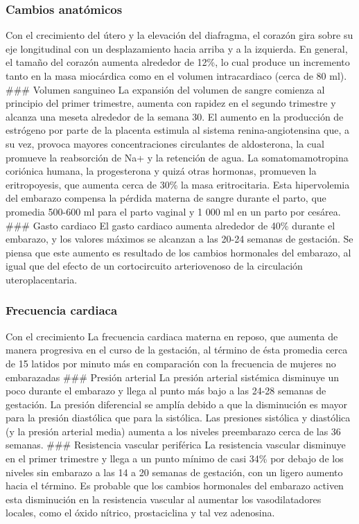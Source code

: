 \documentclass[
]{article}
\begin{document}
\hypertarget{cambios-anatuxf3micos}{%
\subsubsection{Cambios anatómicos}\label{cambios-anatuxf3micos}}

Con el crecimiento del útero y la elevación del diafragma, el corazón
gira sobre su eje longitudinal con un desplazamiento hacia arriba y a la
izquierda. En general, el tamaño del corazón aumenta alrededor de 12\%,
lo cual produce un incremento tanto en la masa miocárdica como en el
volumen intracardiaco (cerca de 80 ml). \#\#\# Volumen sanguineo La
expansión del volumen de sangre comienza al principio del primer
trimestre, aumenta con rapidez en el segundo trimestre y alcanza una
meseta alrededor de la semana 30. El aumento en la producción de
estrógeno por parte de la placenta estimula al sistema
renina-angiotensina que, a su vez, provoca mayores concentraciones
circulantes de aldosterona, la cual promueve la reabsorción de Na+ y la
retención de agua. La somatomamotropina coriónica humana, la
progesterona y quizá otras hormonas, promueven la eritropoyesis, que
aumenta cerca de 30\% la masa eritrocitaria. Esta hipervolemia del
embarazo compensa la pérdida materna de sangre durante el parto, que
promedia 500-600 ml para el parto vaginal y 1 000 ml en un parto por
cesárea. \#\#\# Gasto cardiaco El gasto cardiaco aumenta alrededor de
40\% durante el embarazo, y los valores máximos se alcanzan a las 20-24
semanas de gestación. Se piensa que este aumento es resultado de los
cambios hormonales del embarazo, al igual que del efecto de un
cortocircuito arteriovenoso de la circulación uteroplacentaria.

\hypertarget{frecuencia-cardiaca}{%
\subsubsection{Frecuencia cardiaca}\label{frecuencia-cardiaca}}

Con el crecimiento La frecuencia cardiaca materna en reposo, que aumenta
de manera progresiva en el curso de la gestación, al término de ésta
promedia cerca de 15 latidos por minuto más en comparación con la
frecuencia de mujeres no embarazadas \#\#\# Presión arterial La presión
arterial sistémica disminuye un poco durante el embarazo y llega al
punto más bajo a las 24-28 semanas de gestación. La presión diferencial
se amplía debido a que la disminución es mayor para la presión
diastólica que para la sistólica. Las presiones sistólica y diastólica
(y la presión arterial media) aumenta a los niveles preembarazo cerca de
las 36 semanas. \#\#\# Resistencia vascular periférica La resistencia
vascular disminuye en el primer trimestre y llega a un punto mínimo de
casi 34\% por debajo de los niveles sin embarazo a las 14 a 20 semanas
de gestación, con un ligero aumento hacia el término. Es probable que
los cambios hormonales del embarazo activen esta disminución en la
resistencia vascular al aumentar los vasodilatadores locales, como el
óxido nítrico, prostaciclina y tal vez adenosina.
\end{document}
